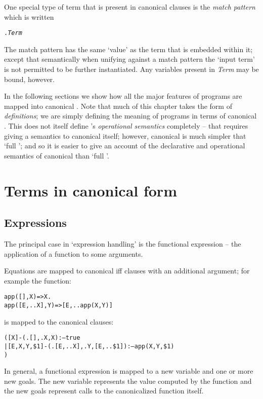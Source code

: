 One special type of term that is present in canonical \go clauses is the \emph{match pattern} which is written
\begin{alltt}
.\emph{Term}
\end{alltt}
The match pattern has the same `value' as the term that is embedded within it; except that semantically when unifying against a match pattern the `input term' is not permitted to be further instantiated. Any variables present in \emph{Term} may be bound, however.

In the following sections we show how all the major features of \go programs are mapped into canonical \go. Note that much of this chapter takes the form of \emph{definitions}; we are simply defining the meaning of \go programs in terms of canonical \go. This does not itself define \go's \emph{operational semantics} completely -- that requires giving a semantics to canonical \go itself; however, canonical \go is much simpler that `full \go'; and so it is easier to give an account of the declarative and operational semantics of canonical \go than `full \go'.

\section{Terms in canonical form}
\label{canonical:term}


\subsection{Expressions}
\label{canonical:expressions}

The principal case in `expression handling' is the functional expression -- the application of a function to some arguments. 

Equations are mapped to canonical iff clauses with an additional argument; for example the function:
\begin{alltt}
app([],X) => X.
app([E,..X],Y) => [E,..app(X,Y)]
\end{alltt}
is mapped to the canonical clauses:
\begin{alltt}
( [X]-(.[],.X,X):--true
| [E,X,Y,\$1]-(.[E,..X],.Y,[E,..\$1]) :-- app(X,Y,\$1)
)
\end{alltt}
In general, a functional expression is mapped to a new variable and one or more new goals. The new variable represents the value computed by the function and the new goals represent calls to the canonicalized function itself.

